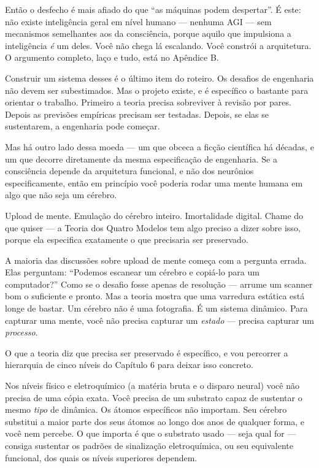 \documentclass[11pt, twoside, openright]{book}
\begin{document}
Então o desfecho é mais afiado do que ``as máquinas podem despertar''. É este: não existe inteligência geral em nível humano --- nenhuma AGI --- sem mecanismos semelhantes aos da consciência, porque aquilo que impulsiona a inteligência \textit{é} um deles. Você não chega lá escalando. Você constrói a arquitetura. O argumento completo, laço e tudo, está no Apêndice B.

Construir um sistema desses é o último item do roteiro. Os desafios de engenharia não devem ser subestimados. Mas o projeto existe, e é específico o bastante para orientar o trabalho. Primeiro a teoria precisa sobreviver à revisão por pares. Depois as previsões empíricas precisam ser testadas. Depois, se elas se sustentarem, a engenharia pode começar.


Mas há outro lado dessa moeda --- um que obceca a ficção científica há décadas, e um que decorre diretamente da mesma especificação de engenharia. Se a consciência depende da arquitetura funcional, e não dos neurônios especificamente, então em princípio você poderia rodar uma mente humana em algo que não seja um cérebro.

Upload de mente. Emulação do cérebro inteiro. Imortalidade digital. Chame do que quiser --- a Teoria dos Quatro Modelos tem algo preciso a dizer sobre isso, porque ela especifica exatamente o que precisaria ser preservado.

A maioria das discussões sobre upload de mente começa com a pergunta errada. Elas perguntam: ``Podemos escanear um cérebro e copiá-lo para um computador?'' Como se o desafio fosse apenas de resolução --- arrume um scanner bom o suficiente e pronto. Mas a teoria mostra que uma varredura estática está longe de bastar. Um cérebro não é uma fotografia. É um sistema dinâmico. Para capturar uma mente, você não precisa capturar um \textit{estado} --- precisa capturar um \textit{processo}.

O que a teoria diz que precisa ser preservado é específico, e vou percorrer a hierarquia de cinco níveis do Capítulo 6 para deixar isso concreto.

Nos níveis físico e eletroquímico (a matéria bruta e o disparo neural) você não precisa de uma cópia exata. Você precisa de um substrato capaz de sustentar o mesmo \textit{tipo} de dinâmica. Os átomos específicos não importam. Seu cérebro substitui a maior parte dos seus átomos ao longo dos anos de qualquer forma, e você nem percebe. O que importa é que o substrato usado --- seja qual for --- consiga sustentar os padrões de sinalização eletroquímica, ou seu equivalente funcional, dos quais os níveis superiores dependem.
\end{document}

